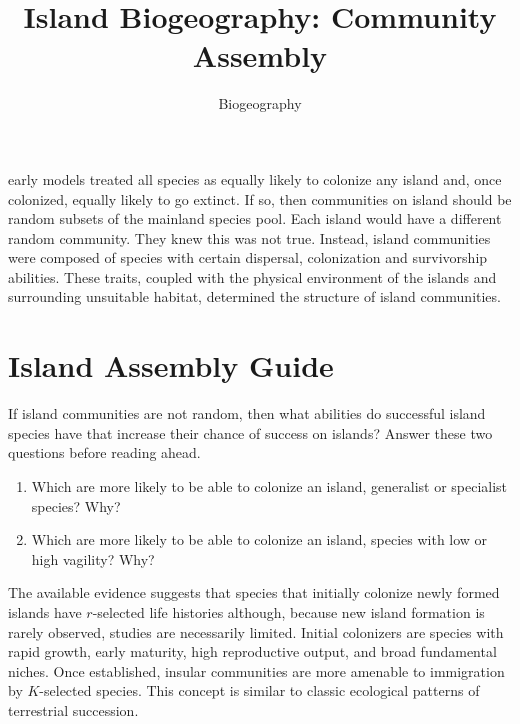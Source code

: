 \documentclass{tufte-handout}
\title{Island Biogeography: Community Assembly}
\author{Biogeography}
\date{}
\begin{document}
\maketitle	%



 early models treated all species as equally likely to colonize any island and, once colonized, equally likely to go extinct. If so, then communities on island should be random subsets of the mainland species pool.  Each island would have a different random community.  They knew this was not true.  Instead, island communities were composed of species with certain dispersal, colonization and survivorship abilities.  These traits, coupled with the physical environment of the islands and surrounding unsuitable habitat, determined the structure of island communities. 

\section{Island Assembly Guide}

If island communities are not random, then what abilities do successful island species have that increase their chance of success on islands?  Answer these two questions before reading ahead.
\begin{enumerate}
	\item Which are more likely to be able to colonize an island, generalist or specialist species? Why?
	\item Which are more likely to be able to colonize an island, species with low or high vagility? Why?  
\end{enumerate}
	
The available evidence suggests that species that initially colonize newly formed islands have $r$-selected life histories although, because new island formation is rarely observed, studies are necessarily limited. Initial colonizers are species with rapid growth, early maturity, high reproductive output, and broad fundamental niches.  Once established, insular communities are more amenable to immigration by $K$-selected species. This concept is similar to classic ecological patterns of terrestrial succession.  
\end{document}
